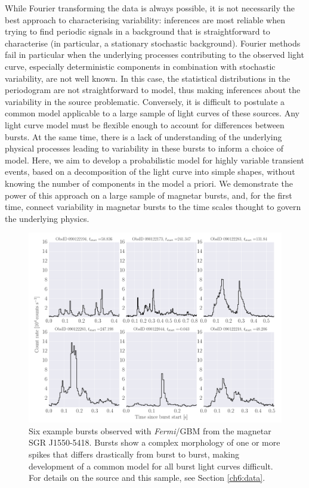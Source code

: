 \documentclass[12pt]{emulateapj}
\newcommand{\project}[1]{\textsl{#1}}
\newcommand{\fermi}{\project{Fermi}}
\begin{document}
While Fourier transforming the data is always possible, it is not necessarily the best approach to characterising variability: inferences are most reliable when trying to find
periodic signals in a background that is straightforward to characterise (in particular, a stationary stochastic background).
Fourier methods fail in particular when the underlying processes contributing to the observed light curve, especially deterministic 
components in combination with stochastic variability, are not well known. In this case,
the statistical distributions in the periodogram are not straightforward to model, thus making inferences about the variability in the source problematic. Conversely, 
it is difficult to postulate a common model applicable to a large sample of light curves of these sources. Any light curve model must be flexible enough to account for differences between bursts. 
At the same time, there is a lack of understanding of the underlying physical processes leading to variability in these bursts to inform a choice of model. Here, we aim to develop a probabilistic 
model for highly variable transient events, based on a decomposition of the light curve into simple shapes, without knowing the number of components in the model a priori. We demonstrate the 
power of this approach on a large sample of magnetar bursts, and, for the first time, connect variability in magnetar bursts to the time scales thought to govern the underlying physics.

\begin{figure}[htbp]
\begin{center}
\includegraphics[width=\textwidth]{f1.pdf}%
\caption{Six example bursts observed with \fermi/GBM from the magnetar SGR J1550-5418. Bursts show a complex morphology of one or more
spikes that differs drastically from burst to burst, making development of a common model for all burst light curves difficult. For details on the source
and this sample, see Section \ref{ch6:data}.}
\label{fig:example_bursts}
\end{center}
\end{figure}
\end{document}
